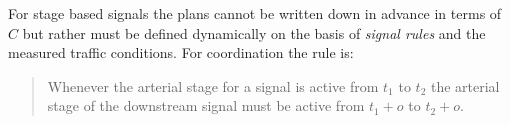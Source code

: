 For stage based signals the plans cannot be written down in advance in terms of $C$ but rather must be defined dynamically on the basis of \textit{signal rules} and the measured traffic conditions. For coordination the rule is:

\begin{quote}
Whenever the arterial stage for a signal is active from $t_1$ to $t_2$ the arterial stage of the downstream signal must be active from $t_1 + o$ to $t_2 + o$.
\end{quote}


